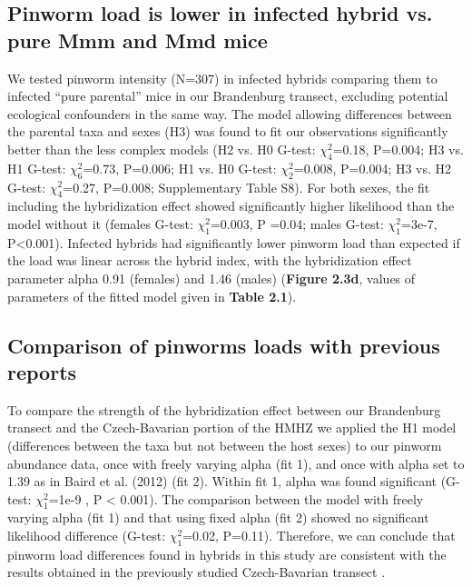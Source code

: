 \subsection{Pinworm load is lower in infected hybrid vs. pure Mmm and Mmd mice} 
We tested pinworm intensity (N=307) in infected hybrids comparing them to infected “pure parental” mice in our Brandenburg transect, excluding potential ecological confounders in the same way. The model allowing differences between the parental taxa and sexes (H3) was found to fit our observations significantly better than the less complex models (H2 vs. H0 G-test: $\chi_{4}^{2}$=0.18, P=0.004; H3 vs. H1 G-test: $\chi_{6}^{2}$=0.73, P=0.006; H1 vs. H0 G-test: $\chi_{2}^{2}$=0.008, P=0.004; H3 vs. H2 G-test: $\chi_{4}^{2}$=0.27, P=0.008; Supplementary Table S8). For both sexes, the fit including the hybridization effect showed significantly higher likelihood than the model without it (females G-test: $\chi_{1}^{2}$=0.003, P =0.04; males G-test: $\chi_{1}^{2}$=3e-7, P<0.001). Infected hybrids had significantly lower pinworm load than expected if the load was linear across the hybrid index, with the hybridization effect parameter alpha 0.91 (females) and 1.46 (males) (\textbf{Figure 2.3d}, values of parameters of the fitted model given in \textbf{Table 2.1}).

\subsection{Comparison of pinworms loads with previous reports}
To compare the strength of the hybridization effect between our Brandenburg transect and the Czech-Bavarian portion of the HMHZ we applied the H1 model (differences between the taxa but not between the host sexes) to our pinworm abundance data, once with freely varying alpha (fit 1), and once with alpha set to 1.39 as in Baird et al. (2012) (fit 2). Within fit 1, alpha was found significant (G-test: $\chi_{1}^{2}$=1e-9 , P < 0.001). The comparison between the model with freely varying alpha (fit 1) and that using fixed alpha (fit 2) showed no significant likelihood difference (G-test: $\chi_{1}^{2}$=0.02, P=0.11). Therefore, we can conclude that pinworm load differences found in hybrids in this study are consistent with the results obtained in the previously studied Czech-Bavarian transect \citep{baird_where_2012}. 


